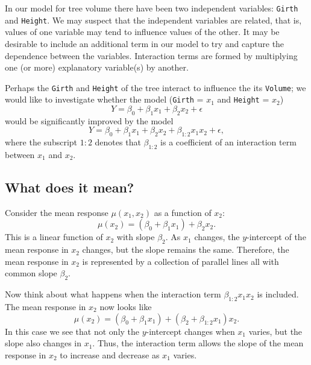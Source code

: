 \documentclass[captions=tableheading]{scrbook}
\begin{document}
In our model for tree volume there have been two independent variables: \texttt{Girth} and \texttt{Height}. We may suspect that the independent variables are related, that is, values of one variable may tend to influence values of the other. It may be desirable to include an additional term in our model to try and capture the dependence between the variables. Interaction terms are formed by multiplying one (or more) explanatory variable(s) by another. 


\begin{example}
Perhaps the \texttt{Girth} and \texttt{Height} of the tree interact to influence the its \texttt{Volume}; we would like to investigate whether the model (\texttt{Girth} = \(x_{1}\) and \texttt{Height} = \(x_{2}\)) 
\begin{equation}
Y=\beta_{0}+\beta_{1}x_{1}+\beta_{2}x_{2}+\epsilon
\end{equation}
would be significantly improved by the model
\begin{equation}
Y=\beta_{0}+\beta_{1}x_{1}+\beta_{2}x_{2}+\beta_{1:2}x_{1}x_{2}+\epsilon,
\end{equation}
where the subscript \(1:2\) denotes that \(\beta_{1:2}\) is a coefficient
of an interaction term between \(x{}_{1}\) and \(x_{2}\). 

\end{example}
\subsection{What does it mean?}
\label{sec-12-5-1}


Consider the mean response \(\mu(x_{1},x_{2})\) as a function of \(x_{2}\):
\begin{equation}
\mu(x_{2})=(\beta_{0}+\beta_{1}x_{1})+\beta_{2}x_{2}.
\end{equation}
This is a linear function of \(x_{2}\) with slope \(\beta_{2}\). As \(x_{1}\) changes, the \(y\)-intercept of the mean response in \(x_{2}\) changes, but the slope remains the same. Therefore, the mean response in \(x_{2}\) is represented by a collection of parallel lines all with common slope \(\beta_{2}\).

Now think about what happens when the interaction term \(\beta_{1:2}x_{1}x_{2}\) is included. The mean response in \(x_{2}\) now looks like
\begin{equation}
\mu(x_{2})=(\beta_{0}+\beta_{1}x_{1})+(\beta_{2}+\beta_{1:2}x_{1})x_{2}.
\end{equation}
In this case we see that not only the \(y\)-intercept changes when \(x_{1}\) varies, but the slope also changes in \(x_{1}\). Thus, the interaction term allows the slope of the mean response in \(x_{2}\) to increase and decrease as \(x_{1}\) varies. 
\end{document}

